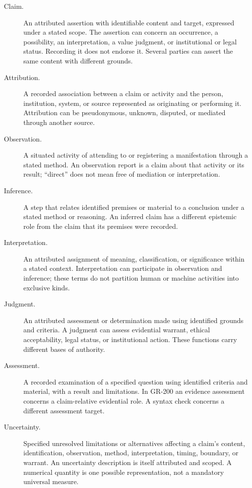 \documentclass[11pt,a4paper]{article}
\begin{document}
\begin{description}
\item[Claim.] An attributed assertion with identifiable content and target, expressed under a stated scope. The assertion can concern an occurrence, a possibility, an interpretation, a value judgment, or institutional or legal status. Recording it does not endorse it. Several parties can assert the same content with different grounds.
\item[Attribution.] A recorded association between a claim or activity and the person, institution, system, or source represented as originating or performing it. Attribution can be pseudonymous, unknown, disputed, or mediated through another source.
\item[Observation.] A situated activity of attending to or registering a manifestation through a stated method. An observation report is a claim about that activity or its result; ``direct'' does not mean free of mediation or interpretation.
\item[Inference.] A step that relates identified premises or material to a conclusion under a stated method or reasoning. An inferred claim has a different epistemic role from the claim that its premises were recorded.
\item[Interpretation.] An attributed assignment of meaning, classification, or significance within a stated context. Interpretation can participate in observation and inference; these terms do not partition human or machine activities into exclusive kinds.
\item[Judgment.] An attributed assessment or determination made using identified grounds and criteria. A judgment can assess evidential warrant, ethical acceptability, legal status, or institutional action. These functions carry different bases of authority.
\item[Assessment.] A recorded examination of a specified question using identified criteria and material, with a result and limitations. In GR-200 an evidence assessment concerns a claim-relative evidential role. A syntax check concerns a different assessment target.
\item[Uncertainty.] Specified unresolved limitations or alternatives affecting a claim's content, identification, observation, method, interpretation, timing, boundary, or warrant. An uncertainty description is itself attributed and scoped. A numerical quantity is one possible representation, not a mandatory universal measure.
\end{description}
\end{document}

